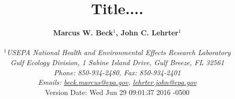 \documentclass[letterpaper,12pt,oneside]{article}\usepackage[]{graphicx}\usepackage[]{color}
\begin{document}
\raggedbottom
\linenumbers
\raggedright
{}
\setlength{\parindent}{0.5in}
\renewcommand\refname{References \vspace{12pt}}

\begin{singlespace}
\title{{\bf {\Large Title....}}}
\author{
  {\bf {\normalsize Marcus W. Beck$^1$, John C. Lehrter$^1$}}
  \\\\{\textit {\normalsize $^1$USEPA National Health and Environmental Effects Research Laboratory}}
  \\{\textit {\normalsize Gulf Ecology Division, 1 Sabine Island Drive, Gulf Breeze, FL 32561}}
	\\{\textit {\normalsize Phone: 850-934-2480, Fax: 850-934-2401}}
	\\{\textit {\normalsize Emails: \href{mailto:beck.marcus@epa.gov}{beck.marcus@epa.gov}, \href{mailto:lehrter.john@epa.gov}{lehrter.john@epa.gov}}}
  \vspace{1in} 
  \\ Version Date:   Wed Jun 29 09:01:37 2016 -0500
	}
\date{}
\maketitle
\end{singlespace}
\clearpage
\end{document}

